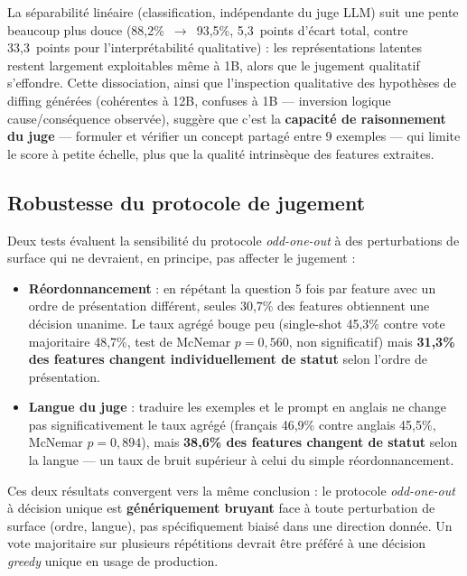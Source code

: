 \documentclass[11pt]{article}
\begin{document}
La séparabilité linéaire (classification, indépendante du juge LLM) suit une
pente beaucoup plus douce (88,2\%~$\to$~93,5\%, 5,3~points d'écart total,
contre 33,3~points pour l'interprétabilité qualitative) : les représentations
latentes restent largement exploitables même à 1B, alors que le jugement
qualitatif s'effondre. Cette dissociation, ainsi que l'inspection qualitative
des hypothèses de diffing générées (cohérentes à 12B, confuses à 1B ---
inversion logique cause/conséquence observée), suggère que c'est la
\textbf{capacité de raisonnement du juge} --- formuler et vérifier un concept
partagé entre 9 exemples --- qui limite le score à petite échelle, plus que
la qualité intrinsèque des features extraites.

\subsection{Robustesse du protocole de jugement}
\label{subsec:robustesse}

Deux tests évaluent la sensibilité du protocole \emph{odd-one-out} à des
perturbations de surface qui ne devraient, en principe, pas affecter le
jugement :

\begin{itemize}
  \item \textbf{Réordonnancement} : en répétant la question 5 fois par
    feature avec un ordre de présentation différent, seules 30,7\% des
    features obtiennent une décision unanime. Le taux agrégé bouge peu
    (single-shot 45,3\% contre vote majoritaire 48,7\%, test de McNemar
    $p=0,560$, non significatif) mais \textbf{31,3\% des features changent
    individuellement de statut} selon l'ordre de présentation.
  \item \textbf{Langue du juge} \cite{resck2025multilingual, multilingualconcepts2025} : traduire les exemples et le prompt en
    anglais ne change pas significativement le taux agrégé (français 46,9\%
    contre anglais 45,5\%, McNemar $p=0,894$), mais \textbf{38,6\% des
    features changent de statut} selon la langue --- un taux de bruit
    supérieur à celui du simple réordonnancement.
\end{itemize}

Ces deux résultats convergent vers la même conclusion : le protocole
\emph{odd-one-out} à décision unique est \textbf{générique\-ment bruyant} face
à toute perturbation de surface (ordre, langue), pas spécifiquement biaisé
dans une direction donnée. Un vote majoritaire sur plusieurs répétitions
devrait être préféré à une décision \emph{greedy} unique en usage de
production.
\end{document}
